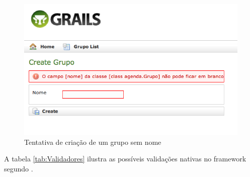 \documentclass[12pt]{article}
\begin{document}
  \begin{figure}[h!]
       \centering
       \includegraphics[width=.4\textwidth]{images/validacaoGrupo.png}
       \caption{Tentativa de criação de um grupo sem nome}
       \label{fig:ValidacaoGrupo}
   \end{figure} 
  
  A tabela \ref{tab:Validadores} ilustra as possíveis validações nativas no 
  framework segundo \cite{pragmaticGrails:2009}.
\end{document}
